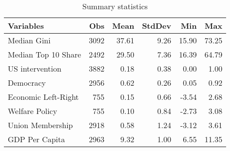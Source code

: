 \begin{table}[ht]
\caption{Summary statistics}
\centering
\begin{tabular}{lrrrrr}
\toprule
 Variables & Obs & Mean & StdDev & Min & Max \\ 
  \midrule
 Median Gini & 3092 & 37.61 & 9.26 & 15.90 & 73.25 \\ 
   Median Top 10 Share & 2492 & 29.50 & 7.36 & 16.39 & 64.79 \\ 
   US intervention & 3882 & 0.18 & 0.38 & 0.00 & 1.00 \\ 
   Democracy & 2956 & 0.62 & 0.26 & 0.05 & 0.92 \\ 
   Economic Left-Right & 755 & 0.15 & 0.66 & -3.54 & 2.68 \\ 
   Welfare Policy & 755 & 0.10 & 0.84 & -2.73 & 3.08 \\ 
   Union Membership & 2918 & 0.58 & 1.24 & -3.12 & 3.61 \\ 
   GDP Per Capita & 2963 & 9.32 & 1.00 & 6.55 & 11.35 \\ 
   \bottomrule
\end{tabular}

\end{table}
